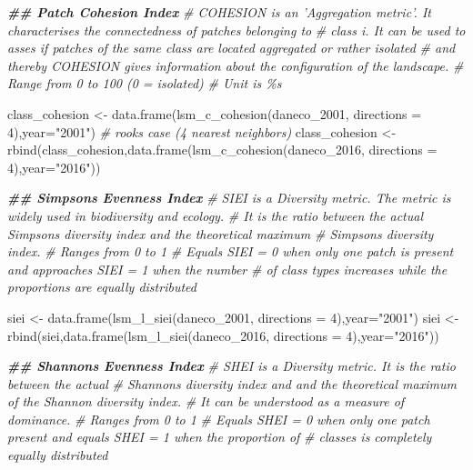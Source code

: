 \documentclass[
]{article}
\newenvironment{Shaded}{\begin{snugshade}}{\end{snugshade}}
\newcommand{\AttributeTok}[1]{\textcolor[rgb]{0.77,0.63,0.00}{#1}}
\newcommand{\CommentTok}[1]{\textcolor[rgb]{0.56,0.35,0.01}{\textit{#1}}}
\newcommand{\DecValTok}[1]{\textcolor[rgb]{0.00,0.00,0.81}{#1}}
\newcommand{\DocumentationTok}[1]{\textcolor[rgb]{0.56,0.35,0.01}{\textbf{\textit{#1}}}}
\newcommand{\FunctionTok}[1]{\textcolor[rgb]{0.00,0.00,0.00}{#1}}
\newcommand{\NormalTok}[1]{#1}
\newcommand{\OtherTok}[1]{\textcolor[rgb]{0.56,0.35,0.01}{#1}}
\newcommand{\StringTok}[1]{\textcolor[rgb]{0.31,0.60,0.02}{#1}}
\begin{document}
\begin{Shaded}
\begin{Highlighting}[]
\DocumentationTok{\#\# Patch Cohesion Index}
\CommentTok{\# COHESION is an ’Aggregation metric’. It characterises the connectedness of patches belonging to}
\CommentTok{\# class i. It can be used to asses if patches of the same class are located aggregated or rather isolated}
\CommentTok{\# and thereby COHESION gives information about the configuration of the landscape.}
\CommentTok{\# Range from 0 to 100 (0 = isolated)}
\CommentTok{\# Unit is \%s}

\NormalTok{class\_cohesion }\OtherTok{\textless{}{-}} \FunctionTok{data.frame}\NormalTok{(}\FunctionTok{lsm\_c\_cohesion}\NormalTok{(daneco\_2001, }\AttributeTok{directions =} \DecValTok{4}\NormalTok{),}\AttributeTok{year=}\StringTok{"2001"}\NormalTok{) }\CommentTok{\# rook\textquotesingle{}s case (4 nearest neighbors)}
\NormalTok{class\_cohesion }\OtherTok{\textless{}{-}} \FunctionTok{rbind}\NormalTok{(class\_cohesion,}\FunctionTok{data.frame}\NormalTok{(}\FunctionTok{lsm\_c\_cohesion}\NormalTok{(daneco\_2016, }\AttributeTok{directions =} \DecValTok{4}\NormalTok{),}\AttributeTok{year=}\StringTok{"2016"}\NormalTok{))}

\DocumentationTok{\#\# Simpson\textquotesingle{}s Evenness Index}
\CommentTok{\# SIEI is a \textquotesingle{}Diversity metric\textquotesingle{}. The metric is widely used in biodiversity and ecology.}
\CommentTok{\# It is the ratio between the actual Simpson\textquotesingle{}s diversity index and the theoretical maximum}
\CommentTok{\# Simpson\textquotesingle{}s diversity index.}
\CommentTok{\# Ranges from 0 to 1}
\CommentTok{\# Equals SIEI = 0 when only one patch is present and approaches SIEI = 1 when the number}
\CommentTok{\# of class types increases while the proportions are equally distributed}

\NormalTok{siei }\OtherTok{\textless{}{-}} \FunctionTok{data.frame}\NormalTok{(}\FunctionTok{lsm\_l\_siei}\NormalTok{(daneco\_2001, }\AttributeTok{directions =} \DecValTok{4}\NormalTok{),}\AttributeTok{year=}\StringTok{"2001"}\NormalTok{)}
\NormalTok{siei }\OtherTok{\textless{}{-}} \FunctionTok{rbind}\NormalTok{(siei,}\FunctionTok{data.frame}\NormalTok{(}\FunctionTok{lsm\_l\_siei}\NormalTok{(daneco\_2016, }\AttributeTok{directions =} \DecValTok{4}\NormalTok{),}\AttributeTok{year=}\StringTok{"2016"}\NormalTok{))}

\DocumentationTok{\#\# Shannon\textquotesingle{}s Evenness Index}
\CommentTok{\# SHEI is a \textquotesingle{}Diversity metric\textquotesingle{}. It is the ratio between the actual}
\CommentTok{\# Shannon\textquotesingle{}s diversity index and and the theoretical maximum of the Shannon diversity index.}
\CommentTok{\# It can be understood as a measure of dominance.}
\CommentTok{\# Ranges from 0 to 1}
\CommentTok{\# Equals SHEI = 0 when only one patch present and equals SHEI = 1 when the proportion of}
\CommentTok{\# classes is completely equally distributed}


\end{Highlighting}
\end{Shaded}
\end{document}
